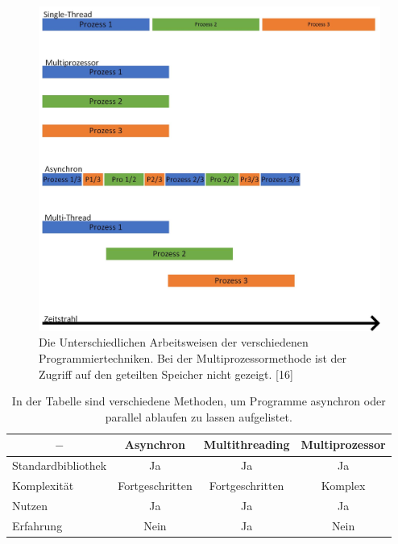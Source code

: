 \begin{figure}[H]
    \centering
    \includegraphics[scale=0.25]{98_images/concurrent_programming.jpg}  %
    \caption{Die Unterschiedlichen Arbeitsweisen der verschiedenen Programmiertechniken. Bei der Multiprozessormethode ist der Zugriff auf den geteilten Speicher nicht gezeigt. [16]}
    \label{fig:multi_threading_async}
\end{figure}

\begin{table}[H]
    \centering
    \begin{tabular}{l|c|c|c}
         \multicolumn{1}{c|}{$-$}&   \textbf{Asynchron}& \textbf{Multithreading}& \textbf{Multiprozessor}\\
         \hline
         Standardbibliothek&        Ja&                 Ja&                 Ja\\
         Komplexität&               Fortgeschritten&    Fortgeschritten&    Komplex\\
         Nutzen&                    Ja&                 Ja&                 Ja\\
         Erfahrung&                 Nein&               Ja&                 Nein
    \end{tabular}
    \caption{In der Tabelle sind verschiedene Methoden, um Programme asynchron oder parallel ablaufen zu lassen aufgelistet.}
    \label{tab:async_threading_multiprocessor}
\end{table}

